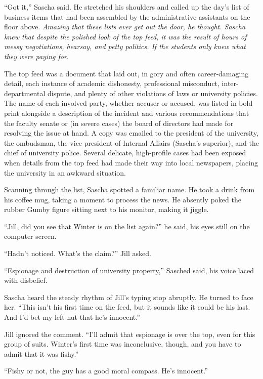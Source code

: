 \documentclass[12pt]{book}
\begin{document}
``Got it,'' Sascha said.  He stretched his shoulders and called up the day's list of business items that had been assembled by the administrative assistants on the floor above.  \emph{Amazing that these lists ever get out the door\emph{, he thought.  Sascha knew that despite the polished look of the top feed, it was the result of hours of messy negotiations, hearsay, and petty politics.  }If the students only knew what they were paying for}.

The top feed was a document that laid out, in gory and often career-damaging detail, each instance of academic dishonesty, professional misconduct, inter-departmental dispute, and plenty of other violations of laws or university policies.  The name of each involved party, whether accuser or accused, was listed in bold print alongside a description of the incident and various recommendations that the faculty senate or (in severe cases) the board of directors had made for resolving the issue at hand.  A copy was emailed to the president of the university, the ombudsman, the vice president of Internal Affairs (Sascha's superior), and the chief of university police.  Several delicate, high-profile cases had been exposed when details from the top feed had made their way into local newspapers, placing the university in an awkward situation.

Scanning through the list, Sascha spotted a familiar name.  He took a drink from his coffee mug, taking a moment to process the news.  He absently poked the rubber Gumby figure sitting next to his monitor, making it jiggle.

``Jill, did you see that Winter is on the list again?'' he said, his eyes still on the computer screen.

``Hadn't noticed.  What's the claim?'' Jill asked.

``Espionage and destruction of university property,'' Sasched said, his voice laced with disbelief.

Sascha heard the steady rhythm of Jill's typing stop abruptly.  He turned to face her.  ``This isn't his first time on the feed, but it sounds like it could be his last.  And I'd bet my left nut that he's innocent.''

Jill ignored the comment.  ``I'll admit that espionage is over the top, even for this group of suits.  Winter's first time was inconclusive, though, and you have to admit that it was fishy.''

``Fishy or not, the guy has a good moral compass.  He's innocent.''
\end{document}
